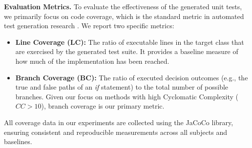 \textbf{Evaluation Metrics.}
To evaluate the effectiveness of the generated unit tests, we primarily focus on code coverage, which is the standard metric in automated test generation research \cite{randoop, evosuite}. We report two specific metrics:
\begin{itemize}
\item \textbf{Line Coverage (LC):} The ratio of executable lines in the target class that are exercised by the generated test suite. It provides a baseline measure of how much of the implementation has been reached.
\item \textbf{Branch Coverage (BC):} The ratio of executed decision outcomes (e.g., the true and false paths of an \textit{if} statement) to the total number of possible branches. Given our focus on methods with high Cyclomatic Complexity ($CC > 10$), branch coverage is our primary metric.
\end{itemize}
All coverage data in our experiments are collected using the JaCoCo library, ensuring consistent and reproducible measurements across all subjects and baselines.


